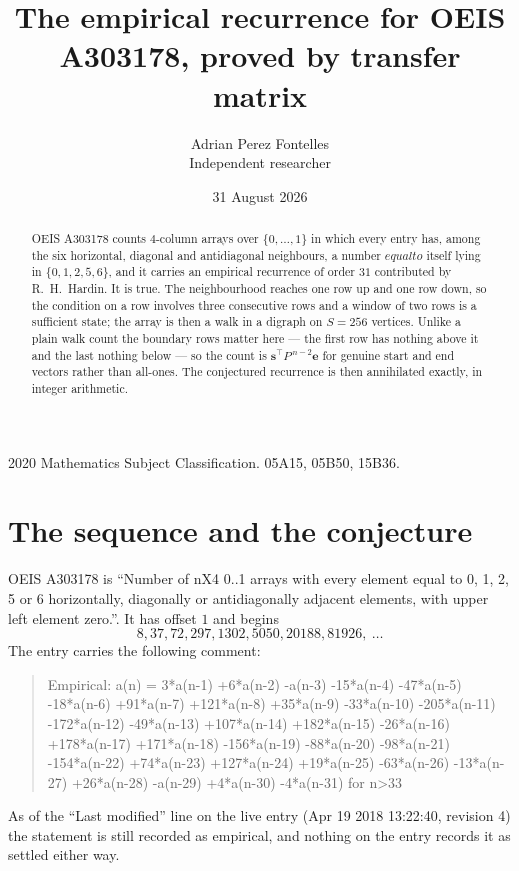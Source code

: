 \documentclass[11pt,a4paper]{article}
\title{The empirical recurrence for OEIS A303178, proved by transfer matrix}
\author{Adrian Perez Fontelles\\ \small Independent researcher}
\date{31 August 2026}
\theoremstyle{plain}
\theoremstyle{definition}
\begin{document}
\maketitle

\begin{abstract}
OEIS A303178 counts $4$-column arrays over $\{0,\dots,1\}$ in which every entry has,
among the six horizontal, diagonal and antidiagonal neighbours, a number $equal to$ itself lying in $\{0,1,2,5,6\}$, and it carries an empirical
recurrence of order $31$ contributed by R.~H.~Hardin. It is true. The neighbourhood
reaches one row up and one row down, so the condition on a row involves three consecutive
rows and a window of two rows is a sufficient state; the array is then a walk in a digraph
on $S=256$ vertices. Unlike a plain walk count the boundary rows matter here --- the first
row has nothing above it and the last nothing below --- so the count is
$\mathbf{s}^{\!\top}P^{\,n-2}\mathbf{e}$ for genuine start and end vectors rather than
all-ones. The conjectured recurrence is then annihilated exactly, in integer arithmetic.
\end{abstract}

\noindent\small 2020 Mathematics Subject Classification. 05A15, 05B50, 15B36.\normalsize

\section{The sequence and the conjecture}

OEIS A303178 is ``Number of nX4 0..1 arrays with every element equal to 0, 1, 2, 5 or 6 horizontally, diagonally or antidiagonally adjacent elements, with upper left element zero.''. It has offset
$1$ and begins
\[
8, 37, 72, 297, 1302, 5050, 20188, 81926,\ \dots
\]
The entry carries the following comment:
\begin{quote}\small
Empirical: a(n) = 3*a(n-1) +6*a(n-2) -a(n-3) -15*a(n-4) -47*a(n-5) -18*a(n-6) +91*a(n-7) +121*a(n-8) +35*a(n-9) -33*a(n-10) -205*a(n-11) -172*a(n-12) -49*a(n-13) +107*a(n-14) +182*a(n-15) -26*a(n-16) +178*a(n-17) +171*a(n-18) -156*a(n-19) -88*a(n-20) -98*a(n-21) -154*a(n-22) +74*a(n-23) +127*a(n-24) +19*a(n-25) -63*a(n-26) -13*a(n-27) +26*a(n-28) -a(n-29) +4*a(n-30) -4*a(n-31) for n>33
\end{quote}
As of the ``Last modified'' line on the live entry (Apr 19 2018 13:22:40, revision
4) the statement is still recorded as empirical, and nothing on the entry
records it as settled either way.
\end{document}
